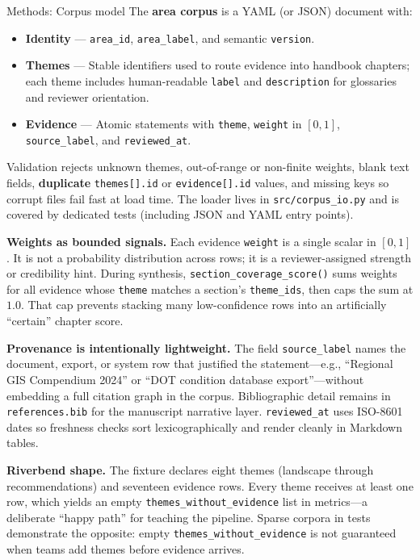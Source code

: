 \documentclass[
  ignorenonframetext,
]{beamer}
\author{\texorpdfstring{}{}}
\date{}
\providecommand{\tightlist}{%
  \setlength{\itemsep}{0pt}\setlength{\parskip}{0pt}}
\begin{document}
\begin{frame}[fragile]{Methods: Corpus model}
\protect{}\label{methods-corpus-model}
The \textbf{area corpus} is a YAML (or JSON) document with:

\begin{itemize}
\tightlist
\item
  \textbf{Identity} --- \texttt{area\_id}, \texttt{area\_label}, and
  semantic \texttt{version}.
\item
  \textbf{Themes} --- Stable identifiers used to route evidence into
  handbook chapters; each theme includes human-readable \texttt{label}
  and \texttt{description} for glossaries and reviewer orientation.
\item
  \textbf{Evidence} --- Atomic statements with \texttt{theme},
  \texttt{weight} in \([0,1]\), \texttt{source\_label}, and
  \texttt{reviewed\_at}.
\end{itemize}

Validation rejects unknown themes, out-of-range or non-finite weights,
blank text fields, \textbf{duplicate} \texttt{themes{[}{]}.id} or
\texttt{evidence{[}{]}.id} values, and missing keys so corrupt files
fail fast at load time. The loader lives in \texttt{src/corpus\_io.py}
and is covered by dedicated tests (including JSON and YAML entry
points).

\textbf{Weights as bounded signals.} Each evidence \texttt{weight} is a
single scalar in \([0,1]\). It is not a probability distribution across
rows; it is a reviewer-assigned strength or credibility hint. During
synthesis, \texttt{section\_coverage\_score()} sums weights for all
evidence whose \texttt{theme} matches a section's \texttt{theme\_ids},
then caps the sum at \(1.0\). That cap prevents stacking many
low-confidence rows into an artificially ``certain'' chapter score.

\textbf{Provenance is intentionally lightweight.} The field
\texttt{source\_label} names the document, export, or system row that
justified the statement---e.g., ``Regional GIS Compendium 2024'' or
``DOT condition database export''---without embedding a full citation
graph in the corpus. Bibliographic detail remains in
\texttt{references.bib} for the manuscript narrative layer.
\texttt{reviewed\_at} uses ISO-8601 dates so freshness checks sort
lexicographically and render cleanly in Markdown tables.

\textbf{Riverbend shape.} The fixture declares eight themes (landscape
through recommendations) and seventeen evidence rows. Every theme
receives at least one row, which yields an empty
\texttt{themes\_without\_evidence} list in metrics---a deliberate
``happy path'' for teaching the pipeline. Sparse corpora in tests
demonstrate the opposite: empty \texttt{themes\_without\_evidence} is
not guaranteed when teams add themes before evidence arrives.
\end{frame}
\end{document}

